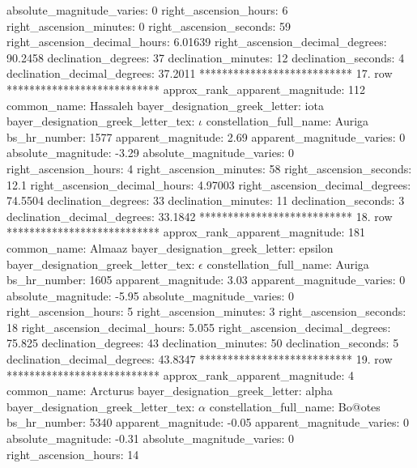         absolute_magnitude_varies: 0
             right_ascension_hours: 6
           right_ascension_minutes: 0
           right_ascension_seconds: 59
     right_ascension_decimal_hours: 6.01639
   right_ascension_decimal_degrees: 90.2458
               declination_degrees: 37
               declination_minutes: 12
               declination_seconds: 4
       declination_decimal_degrees: 37.2011
*************************** 17. row ***************************
    approx_rank_apparent_magnitude: 112
                       common_name: Hassaleh
    bayer_designation_greek_letter: iota
bayer_designation_greek_letter_tex: $\iota$
           constellation_full_name: Auriga
                      bs_hr_number: 1577
                apparent_magnitude: 2.69
         apparent_magnitude_varies: 0
                absolute_magnitude: -3.29
         absolute_magnitude_varies: 0
             right_ascension_hours: 4
           right_ascension_minutes: 58
           right_ascension_seconds: 12.1
     right_ascension_decimal_hours: 4.97003
   right_ascension_decimal_degrees: 74.5504
               declination_degrees: 33
               declination_minutes: 11
               declination_seconds: 3
       declination_decimal_degrees: 33.1842
*************************** 18. row ***************************
    approx_rank_apparent_magnitude: 181
                       common_name: Almaaz
    bayer_designation_greek_letter: epsilon
bayer_designation_greek_letter_tex: $\epsilon$
           constellation_full_name: Auriga
                      bs_hr_number: 1605
                apparent_magnitude: 3.03
         apparent_magnitude_varies: 0
                absolute_magnitude: -5.95
         absolute_magnitude_varies: 0
             right_ascension_hours: 5
           right_ascension_minutes: 3
           right_ascension_seconds: 18
     right_ascension_decimal_hours: 5.055
   right_ascension_decimal_degrees: 75.825
               declination_degrees: 43
               declination_minutes: 50
               declination_seconds: 5
       declination_decimal_degrees: 43.8347
*************************** 19. row ***************************
    approx_rank_apparent_magnitude: 4
                       common_name: Arcturus
    bayer_designation_greek_letter: alpha
bayer_designation_greek_letter_tex: $\alpha$
           constellation_full_name: Bo@otes
                      bs_hr_number: 5340
                apparent_magnitude: -0.05
         apparent_magnitude_varies: 0
                absolute_magnitude: -0.31
         absolute_magnitude_varies: 0
             right_ascension_hours: 14
